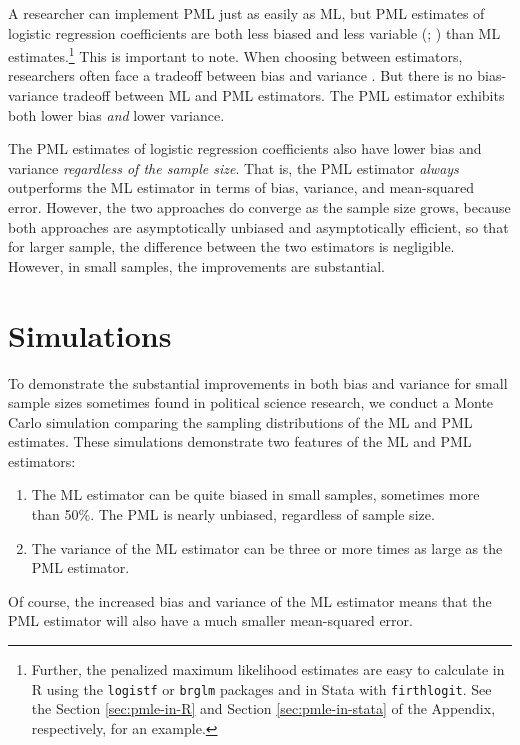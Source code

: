 \documentclass[12pt]{article}
\begin{document}
A researcher can implement PML just as easily as ML, but PML estimates of logistic regression coefficients are both less biased \citep{Firth1993} and less variable (\citealt[p. 49]{Kosmidis2007}; \citealt{Copas1988}) than ML estimates.\footnote{Further, the penalized maximum likelihood estimates are easy to calculate in R using the \texttt{logistf} or \texttt{brglm} packages and in Stata with \texttt{firthlogit}. 
See the Section \ref{sec:pmle-in-R} and Section \ref{sec:pmle-in-stata} of the Appendix, respectively, for an example.}
This is important to note. 
When choosing between estimators, researchers often face a tradeoff between bias and variance \citep[pp. 37-38]{HastieTibshiraniFriedman2013}.
But there is no bias-variance tradeoff between ML and PML estimators.
The PML estimator exhibits both lower bias \textit{and} lower variance.

The PML estimates of logistic regression coefficients also have lower bias and variance \textit{regardless of the sample size}. That is, the PML estimator \textit{always} outperforms the ML estimator in terms of bias, variance, and mean-squared error. 
However, the two approaches do converge as the sample size grows, because both approaches are asymptotically unbiased and asymptotically efficient, so that for larger sample, the difference between the two estimators is negligible. However, in small samples, the improvements are substantial.

\section*{Simulations}

To demonstrate the substantial improvements in both bias and variance for small sample sizes sometimes found in political science research, we conduct a Monte Carlo simulation comparing the sampling distributions of the ML and PML estimates.
These simulations demonstrate two features of the ML and PML estimators:
\begin{enumerate}
\item The ML estimator can be quite biased in small samples, sometimes more than 50\%. The PML is nearly unbiased, regardless of sample size.
\item The variance of the ML estimator can be three or more times as large as the PML estimator.
\end{enumerate}
Of course, the increased bias and variance of the ML estimator means that the PML estimator will also have a much smaller mean-squared error.
\end{document}
